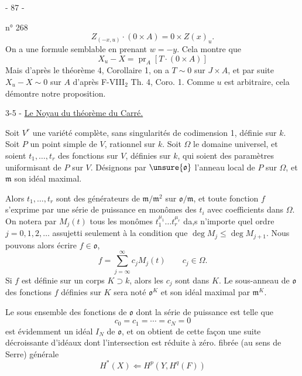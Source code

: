 
\begin{center}- 87 -\end{center}
n° 268
\[
Z_{(-x,u)}\cdot(0\times A)=0\times Z(x)_u.
\]
On a une formule semblable en prenant $w=-y$. Cela montre que
\[
X_u-X=\operatorname{pr}_A[T\cdot(0\times A)]
\]
Mais d'après le théorème 4, Corollaire 1, on a $T\sim0$ sur $J\times A$, et par suite $X_u-X\sim0$ sur $A$ d'après F-VIII$_2$ Th. 4, Coro. 1. Comme $u$ est arbitraire, cela démontre notre proposition.

3-5 - \uline{Le Noyau du théorème du Carré.}

Soit $V^r$ une variété complète, sans singularités de codimension 1, définie sur $k$. Soit $P$ un point simple de $V$, rationnel sur $k$. Soit $\Omega$ le domaine universel, et soient $t_1,\ldots,t_r$ des fonctions sur $V$, définies sur $k$, qui soient des paramètres uniformisant de $P$ sur $V$. Désignons par $\unsure{\mathfrak{o}}$ l'anneau local de $P$ sur $\Omega$, et $\mathfrak{m}$ son idéal maximal.

Alors $t_1,\ldots,t_r$ sont des générateurs de $\mathfrak{m}/\mathfrak{m}^2$ sur $\mathfrak{o}/\mathfrak{m}$, et toute fonction $f$ s'exprime par une série de puissance en monômes des $t_i$ avec coefficients dans $\Omega$. On notera par $M_j(t)$ tous les monômes $t_1^{\mu_1}\ldots t_r^{\mu_r}$ da,s n'importe quel ordre $j=0,1,2,\ldots$ assujetti seulement à la condition que $\deg M_j\leq\deg M_{j+1}$. Nous pouvons alors écrire $f\in\mathfrak{o}$,
\[
f=\sum_{j=\infty}^{\infty}c_jM_j(t)\qquad c_j\in\Omega.
\]
Si $f$ est définie sur un corps $K\supset k$, alors les $c_j$ sont dans $K$. Le sous-anneau de $\mathfrak{o}$ des fonctions $f$ définies sur $K$ sera noté $\mathfrak{o}^K$ et son idéal maximal par $\mathfrak{m}^K$.

Le sous ensemble des fonctions de $\mathfrak{o}$ dont la série de puissance est telle que
\[
c_0=c_1=\cdots=c_N=0
\]
est évidemment un idéal $I_N$ de $\mathfrak{o}$, et on obtient de cette façon une suite décroissante d'idéaux dont l'intersection est réduite à zéro.
 fibrée (au sens de Serre) générale
\[
H^*(X)\Longleftarrow H^p(Y,H^q(F))
\]

